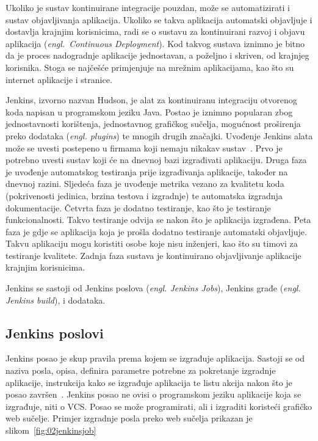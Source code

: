 Ukoliko je sustav kontinuirane integracije pouzdan, može se automatizirati i sustav objavljivanja
aplikacija. Ukoliko se takva aplikacija automatski objavljuje i dostavlja krajnjim korisnicima, radi
se o sustavu za kontinuirani razvoj i objavu aplikacija (\textit{engl.~Continuous Deployment}). Kod
takvog sustava iznimno je bitno da je proces nadogradnje aplikacije jednostavan, a poželjno i
skriven, od krajnjeg korisnika. Stoga se najčešće primjenjuje na mrežnim aplikacijama, kao što su
internet aplikacije i stranice.

Jenkins, izvorno nazvan Hudson, je alat za kontinuiranu integraciju otvorenog koda napisan u
programskom jeziku Java. Postao je iznimno popularan zbog jednostavnosti korištenja, jednostavnog
grafičkog sučelja, mogućnost proširenja preko dodataka (\textit{engl. plugins}) te mnogih drugih
značajki. Uvođenje Jenkins alata može se uvesti postepeno u firmama koji nemaju nikakav
sustav~\citep{smart2011jenkins}. Prvo je potrebno uvesti sustav koji će na dnevnoj bazi izgrađivati
aplikaciju. Druga faza je uvođenje automatskog testiranja prije izgrađivanja aplikacije, također na
dnevnoj razini. Sljedeća faza je uvođenje metrika vezano za kvalitetu koda (pokrivenosti jedinica,
brzina testova i izgradnje) te automatska izgradnja dokumentacije. Četvrta faza je dodatno
testiranje, kao što je testiranje funkcionalnosti. Takvo testiranje odvija se nakon što je
aplikacija izgrađena. Peta faza je gdje se aplikacija koja je prošla dodatno testiranje automatski
objavljuje. Takvu aplikaciju mogu koristiti osobe koje nisu inženjeri, kao što su timovi za
testiranje kvalitete. Zadnja faza sustava je kontinuirano objavljivanje aplikacije krajnjim
korisnicima.

Jenkins se sastoji od Jenkins poslova (\textit{engl. Jenkins Jobs}), Jenkins građe (\textit{engl.
Jenkins build}), %
i dodataka.

\subsection{Jenkins poslovi}
Jenkins posao je skup pravila prema kojem se izgrađuje aplikacija. Sastoji se od naziva posla,
opisa, definira parametre potrebne za pokretanje izgradnje aplikacije, instrukcija kako se izgrađuje
aplikacija te listu akcija nakon što je posao završen~\citep{pathania2016learning}. Jenkins posao ne
ovisi o programskom jeziku aplikacije koja se izgrađuje, niti o VCS. Posao se može programirati, ali
i izgraditi koristeći grafičko web sučelje. Primjer izgradnje posla preko web sučelja prikazan je
slikom~\ref{fig:02jenkinsjob}

